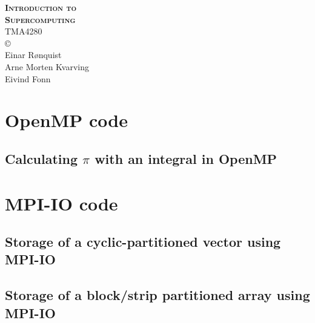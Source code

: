 \documentclass[onecolumn, twoside, a4paper, 11pt]{memoir}
\begin{document}
\begin{titlingpage}
  \centering
  {\Huge \bfseries \scshape
    Introduction to \\[0.2\baselineskip] Supercomputing} \\[2\baselineskip]
  {\Large TMA4280} \\[0.7\textheight]
  \copyright \\
  Einar R{\o}nquist \\
  Arne Morten Kvarving \\
  Eivind Fonn
\end{titlingpage}












\nocite{openmp}
\nocite{openmptut}
\nocite{towards}
\nocite{mpi-io}
\nocite{mpi-io2}
\nocite{culler1999parallel}
\nocite{douglas2000portable}
\nocite{lande2004}




\appendix

\chapter{OpenMP code}
\lstset{inputpath=code/openmp/}

\section{Calculating $\pi$ with an integral in OpenMP}
\label{app:openmp-integrate}


\chapter{MPI-IO code}
\lstset{inputpath=code/mpiio/}

\section{Storage of a cyclic-partitioned vector using MPI-IO}
\label{app:cyclicvector}


\newpage

\section{Storage of a block/strip partitioned array using MPI-IO}
\label{app:darray}

\end{document}
